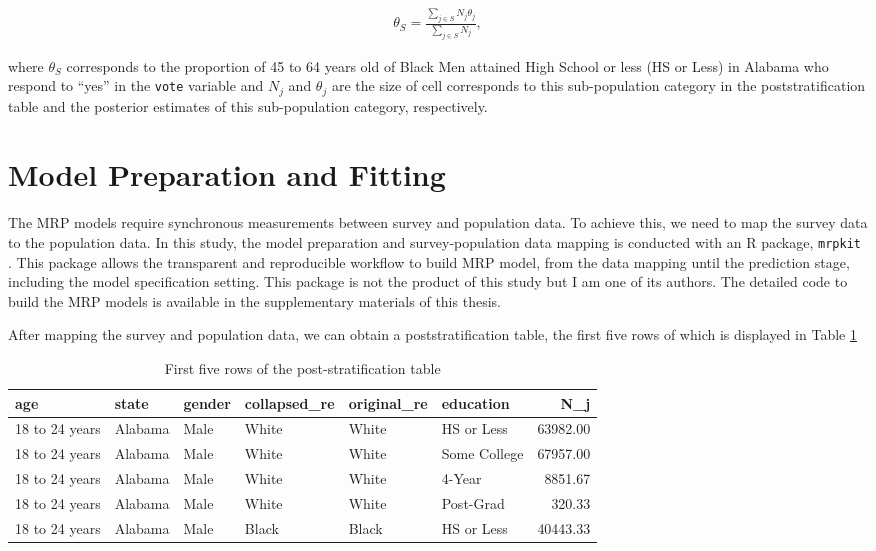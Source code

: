 \documentclass{monashthesis}
\begin{document}
\begin{equation} 
\begin{split}
\theta_S = \frac{\sum_{j\in S}N_j\theta_j}{\sum_{j\in S}N_j},
\end{split}
\label{eq:poststrat-observed}
\end{equation}

where \(\theta_S\) corresponds to the proportion of 45 to 64 years old of Black Men attained High School or less (HS or Less) in Alabama who respond to ``yes'' in the \texttt{vote} variable and \(N_j\) and \(\theta_j\) are the size of cell corresponds to this sub-population category in the poststratification table and the posterior estimates of this sub-population category, respectively.

\hypertarget{prep}{%
\section{Model Preparation and Fitting}\label{prep}}

The MRP models require synchronous measurements between survey and population data. To achieve this, we need to map the survey data to the population data. In this study, the model preparation and survey-population data mapping is conducted with an R package, \texttt{mrpkit} \autocite{mrpkit}. This package allows the transparent and reproducible workflow to build MRP model, from the data mapping until the prediction stage, including the model specification setting. This package is not the product of this study but I am one of its authors. The detailed code to build the MRP models is available in the supplementary materials of this thesis.

After mapping the survey and population data, we can obtain a poststratification table, the first five rows of which is displayed in Table \ref{tab:post-strat-table}

\begin{table}

\caption{\label{tab:post-strat-table}First five rows of the post-stratification table}
\centering
\begin{tabular}[t]{llllllr}
\toprule
age & state & gender & collapsed\_re & original\_re & education & N\_j\\
\midrule
18 to 24 years & Alabama & Male & White & White & HS or Less & 63982.00\\
18 to 24 years & Alabama & Male & White & White & Some College & 67957.00\\
18 to 24 years & Alabama & Male & White & White & 4-Year & 8851.67\\
18 to 24 years & Alabama & Male & White & White & Post-Grad & 320.33\\
18 to 24 years & Alabama & Male & Black & Black & HS or Less & 40443.33\\
\bottomrule
\end{tabular}
\end{table}
\end{document}
